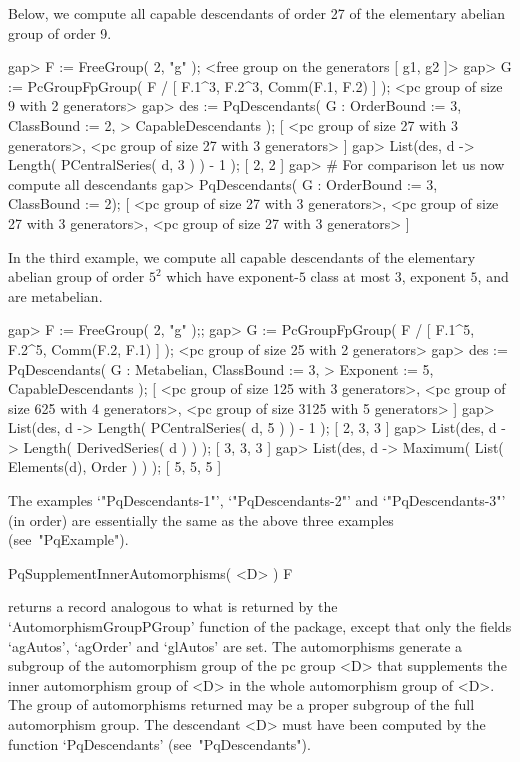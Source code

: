 Below, we compute all capable descendants of order 27 of  the  elementary
abelian group of order 9.

\beginexample
gap> F := FreeGroup( 2, "g" );
<free group on the generators [ g1, g2 ]>
gap> G := PcGroupFpGroup( F / [ F.1^3, F.2^3, Comm(F.1, F.2) ] );
<pc group of size 9 with 2 generators>
gap> des := PqDescendants( G : OrderBound := 3, ClassBound := 2,
>                              CapableDescendants );
[ <pc group of size 27 with 3 generators>, 
  <pc group of size 27 with 3 generators> ]
gap> List(des, d -> Length( PCentralSeries( d, 3 ) ) - 1 );
[ 2, 2 ]
gap> # For comparison let us now compute all descendants
gap> PqDescendants( G : OrderBound := 3, ClassBound := 2);
[ <pc group of size 27 with 3 generators>, 
  <pc group of size 27 with 3 generators>, 
  <pc group of size 27 with 3 generators> ]
\endexample

In  the  third  example,  we  compute  all  capable  descendants  of  the
elementary abelian group of order  $5^2$ which have exponent-$5$ class at
most $3$, exponent $5$, and are metabelian.

\beginexample
gap> F := FreeGroup( 2, "g" );;                                  
gap> G := PcGroupFpGroup( F / [ F.1^5, F.2^5, Comm(F.2, F.1) ] );
<pc group of size 25 with 2 generators>
gap> des := PqDescendants( G : Metabelian, ClassBound := 3,
>                              Exponent := 5, CapableDescendants );
[ <pc group of size 125 with 3 generators>, 
  <pc group of size 625 with 4 generators>, 
  <pc group of size 3125 with 5 generators> ]
gap> List(des, d -> Length( PCentralSeries( d, 5 ) ) - 1 );
[ 2, 3, 3 ]
gap> List(des, d -> Length( DerivedSeries( d ) ) );
[ 3, 3, 3 ]
gap> List(des, d -> Maximum( List( Elements(d), Order ) ) );     
[ 5, 5, 5 ]
\endexample

The     examples     `"PqDescendants-1"',     `"PqDescendants-2"'     and
`"PqDescendants-3"' (in order) are essentially  the  same  as  the  above
three examples (see~"PqExample").

\>PqSupplementInnerAutomorphisms( <D> ) F

returns   a   record   analogous   to   what   is   returned    by    the
`AutomorphismGroupPGroup' function of the {\AutPGrp} package, except that
only  the  fields  `agAutos',  `agOrder'  and  `glAutos'  are  set.   The
automorphisms generate a subgroup of the automorphism  group  of  the  pc
group <D> that supplements the inner automorphism group  of  <D>  in  the
whole automorphism group of <D>. The group of automorphisms returned  may
be a proper subgroup of the full automorphism group. The  descendant  <D>
must   have   been   computed    by    the    function    `PqDescendants'
(see~"PqDescendants").

